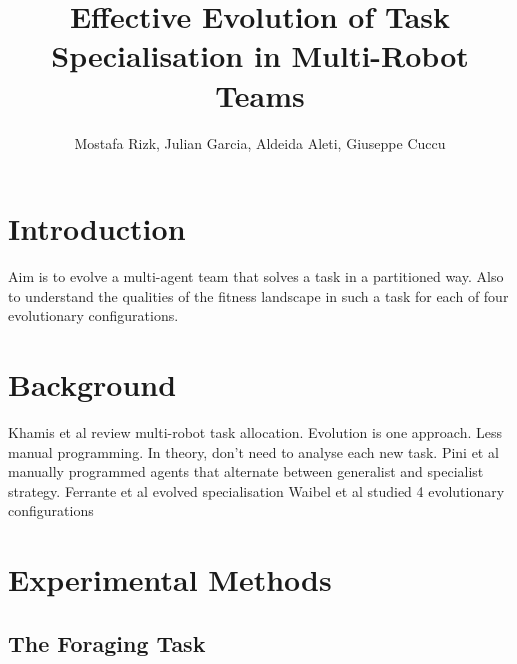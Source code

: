 \documentclass[12pt]{article}  %
\author{Mostafa Rizk, Julian Garcia, Aldeida Aleti, Giuseppe Cuccu}
\begin{document}
\title{Effective Evolution of Task Specialisation in Multi-Robot Teams}  
\maketitle


\section{Introduction}

Aim is to evolve a multi-agent team that solves a task in a partitioned way. 
Also to understand the qualities of the fitness landscape in such a task for each of four evolutionary configurations. 

\section{Background}

Khamis et al review multi-robot task allocation. Evolution is one approach. Less manual programming. In theory, don’t need to analyse each new task.
Pini et al manually programmed agents that alternate between generalist and specialist strategy.
Ferrante et al \cite{ferrante:PLOS_CB:2015} evolved specialisation 
Waibel et al studied 4 evolutionary configurations \cite{waibel:Transactions:2009}

\section{Experimental Methods}

\subsection{The Foraging Task}
\end{document}

